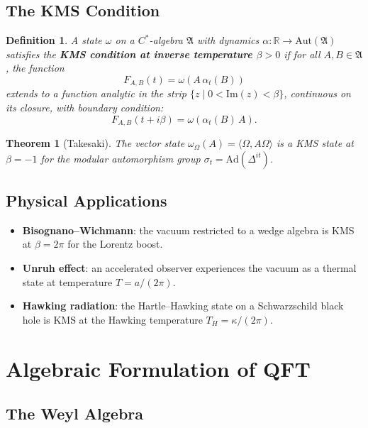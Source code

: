 \documentclass[11pt,a4paper]{article}
\newtheorem{definition}{Definition}[section]
\newtheorem{theorem}{Theorem}[section]
\begin{document}
\subsection{The KMS Condition}

\begin{definition}
A state $\omega$ on a $C^*$-algebra $\mathfrak{A}$ with dynamics
$\alpha: \mathbb{R} \to \mathrm{Aut}(\mathfrak{A})$ satisfies the
\textbf{KMS condition at inverse temperature $\beta > 0$} if for all
$A, B \in \mathfrak{A}$, the function
\[
  F_{A,B}(t) = \omega(A\, \alpha_t(B))
\]
extends to a function analytic in the strip $\{z \mid 0 < \mathrm{Im}(z) < \beta\}$,
continuous on its closure, with boundary condition:
\[
  F_{A,B}(t + i\beta) = \omega(\alpha_t(B)\, A).
\]
\end{definition}

\begin{theorem}[Takesaki]
The vector state $\omega_\Omega(A) = \langle\Omega, A\Omega\rangle$ is a
KMS state at $\beta = -1$ for the modular automorphism group
$\sigma_t = \mathrm{Ad}(\Delta^{it})$.
\end{theorem}

\subsection{Physical Applications}

\begin{itemize}[nosep]
  \item \textbf{Bisognano--Wichmann}: the vacuum restricted to a wedge
        algebra is KMS at $\beta = 2\pi$ for the Lorentz boost.
  \item \textbf{Unruh effect}: an accelerated observer experiences the vacuum
        as a thermal state at temperature $T = a/(2\pi)$.
  \item \textbf{Hawking radiation}: the Hartle--Hawking state on a Schwarzschild
        black hole is KMS at the Hawking temperature $T_H = \kappa/(2\pi)$.
\end{itemize}

\section{Algebraic Formulation of QFT}

\subsection{The Weyl Algebra}
\end{document}
